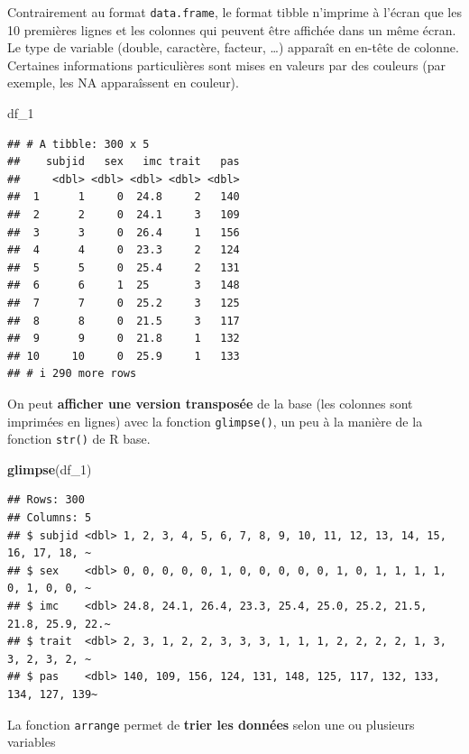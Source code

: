 \documentclass[
]{book}
\newenvironment{Shaded}{\begin{snugshade}}{\end{snugshade}}
\newcommand{\FunctionTok}[1]{\textcolor[rgb]{0.13,0.29,0.53}{\textbf{#1}}}
\newcommand{\NormalTok}[1]{#1}
\begin{document}
Contrairement au format \texttt{data.frame}, le format tibble n'imprime à l'écran que les 10 premières lignes et les colonnes qui peuvent être affichée dans un même écran. Le type de variable (double, caractère, facteur, \ldots) apparaît en en-tête de colonne. Certaines informations particulières sont mises en valeurs par des couleurs (par exemple, les NA apparaîssent en couleur).

\begin{Shaded}
\begin{Highlighting}[]
\NormalTok{df\_1}
\end{Highlighting}
\end{Shaded}

\begin{verbatim}
## # A tibble: 300 x 5
##    subjid   sex   imc trait   pas
##     <dbl> <dbl> <dbl> <dbl> <dbl>
##  1      1     0  24.8     2   140
##  2      2     0  24.1     3   109
##  3      3     0  26.4     1   156
##  4      4     0  23.3     2   124
##  5      5     0  25.4     2   131
##  6      6     1  25       3   148
##  7      7     0  25.2     3   125
##  8      8     0  21.5     3   117
##  9      9     0  21.8     1   132
## 10     10     0  25.9     1   133
## # i 290 more rows
\end{verbatim}

On peut \textbf{afficher une version transposée} de la base (les colonnes sont imprimées en lignes) avec la fonction \texttt{glimpse()}, un peu à la manière de la fonction \texttt{str()} de R base.

\begin{Shaded}
\begin{Highlighting}[]
\FunctionTok{glimpse}\NormalTok{(df\_1)}
\end{Highlighting}
\end{Shaded}

\begin{verbatim}
## Rows: 300
## Columns: 5
## $ subjid <dbl> 1, 2, 3, 4, 5, 6, 7, 8, 9, 10, 11, 12, 13, 14, 15, 16, 17, 18, ~
## $ sex    <dbl> 0, 0, 0, 0, 0, 1, 0, 0, 0, 0, 0, 1, 0, 1, 1, 1, 1, 0, 1, 0, 0, ~
## $ imc    <dbl> 24.8, 24.1, 26.4, 23.3, 25.4, 25.0, 25.2, 21.5, 21.8, 25.9, 22.~
## $ trait  <dbl> 2, 3, 1, 2, 2, 3, 3, 3, 1, 1, 1, 2, 2, 2, 2, 1, 3, 3, 2, 3, 2, ~
## $ pas    <dbl> 140, 109, 156, 124, 131, 148, 125, 117, 132, 133, 134, 127, 139~
\end{verbatim}

La fonction \texttt{arrange} permet de \textbf{trier les données} selon une ou plusieurs variables
\end{document}
